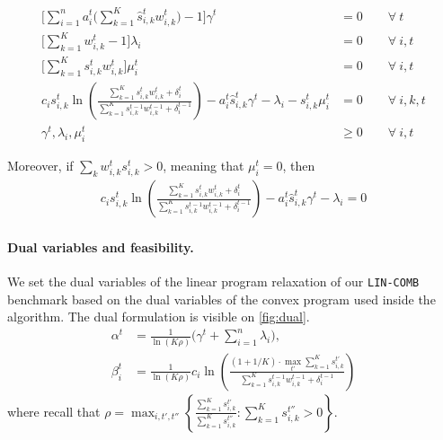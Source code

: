 \begin{align*}
   \biggl[ \sum_{i=1}^{n} a_{i}^{t} \biggl( \sum_{k=1}^{K}  \hat{s}_{i,k}^{t} w_{i,k}^{t} \biggr) - 1 \biggr] \gamma^{t} &= 0 \qquad \forall\ t \\
   \biggl[ \sum_{k=1}^{K}  w_{i,k}^{t}  - 1 \biggr] \lambda_{i} &= 0 \qquad \forall\ i, t \\
   \biggl[ \sum_{k=1}^{K}  s_{i,k}^{t} w_{i,k}^{t} \biggr] \mu_{i}^{t} &= 0 \qquad \forall\ i, t \\
%
 c_{i} s_{i,k}^{t} \ln \left( \frac{\sum_{k=1}^{K} s_{i,k}^{t} w_{i,k}^{t} + \delta_{i}^{t}}{\sum_{k=1}^{K}  s_{i,k}^{t-1}w_{i,k}^{t-1}  + \delta_{i}^{t-1}} \right)
    	- a_{i}^{t} \hat{s}_{i,k}^{t} \gamma^{t} - \lambda_{i} - s_{i,k}^{t} \mu_{i}^{t} &= 0	\qquad \forall\ i,k,t \\
	\gamma^{t}, \lambda_{i}, \mu_{i}^{t} &\geq 0 \qquad \forall\ i, t
\end{align*}

Moreover, if $\sum_{k} w_{i,k}^{t} s_{i,k}^{t} > 0$, meaning that $\mu_{i}^{t} = 0$, then
\begin{align}	\label{eq:KKT1}
   c_{i} s_{i,k}^{t} \ln \left( \frac{\sum_{k=1}^{K} s_{i,k}^{t} w_{i,k}^{t}  + \delta_{i}^{t}}{\sum_{k=1}^{K}  s_{i,k}^{t-1}w_{i,k}^{t-1}  + \delta_{i}^{t-1}} \right)
    	- a_{i}^{t} \hat{s}_{i,k}^{t} \gamma^{t} - \lambda_{i} = 0
\end{align}

\clearpage

\paragraph{Dual variables and feasibility.} We set the dual variables of the linear program relaxation of our \texttt{LIN-COMB} benchmark based on the dual variables of the convex program used inside the algorithm. The dual formulation is visible on \cref{fig:dual}.
%
\begin{align*}
    \alpha^{t} &= \frac{1}{\ln(K\rho)}  \biggl( \gamma^{t} + \sum_{i=1}^{n} \lambda_{i} \biggr), \\
    \beta_{i}^{t} &= \frac{1}{\ln(K\rho)} c_i \ln \left(\frac{ (1 + 1/K) \cdot \max_{t'} \sum_{k=1}^{K} s_{i,k}^{t'}}{\sum_{k=1}^{K}  s_{i,k}^{t-1} w_{i,k}^{t-1} + \delta_{i}^{t-1}}\right)
\end{align*}
%
where recall that $\rho = \max_{i, t',t''} \left\{\frac{\sum_{k=1}^{K} s_{i,k}^{t'}}{\sum_{k=1}^{K} s_{i,k}^{t''}} : \sum_{k=1}^{K} s_{i,k}^{t''} > 0 \right\}$.

